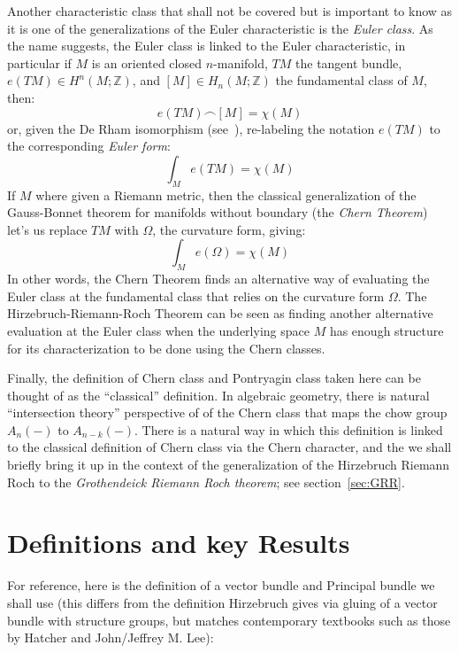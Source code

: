 \documentclass{ut-thesis}
\newcommand{\Z}{{\mathbb{Z}}}
\begin{document}
Another characteristic class that shall not be covered but is important to know as it is one of the
generalizations of the Euler characteristic is the \emph{Euler class}. As
the name suggests, the Euler class is linked to the Euler characteristic, in particular if $M$ is an oriented
closed $n$-manifold, $TM$ the tangent bundle, $e(TM) \in H^n(M; \Z)$, and $[M] \in H_n(M; \Z)$ the fundamental class of $M$, then:
\[
  e(TM) \frown [M] = \chi(M)
\]
or, given the De Rham isomorphism (see~\cite{NateDiffGeo}), re-labeling the notation $e(TM)$ to the corresponding \emph{Euler form}:
\[
  \int_M e(TM) = \chi(M)
\]
If $M$ where given a Riemann metric, then the classical generalization of the Gauss-Bonnet theorem for
manifolds without boundary (the \emph{Chern Theorem}) let's us replace $TM$ with $\Omega$, the curvature form,
giving:
\[
  \int_M e(\Omega) = \chi(M)
\]
In other words, the Chern Theorem finds an alternative way of evaluating the Euler class at the fundamental
class that relies on the curvature form $\Omega$. The Hirzebruch-Riemann-Roch Theorem can be seen as
finding another alternative evaluation at the Euler class when the underlying space $M$ has enough structure for
its characterization to be done using the Chern classes.

Finally, the definition of Chern class and Pontryagin class taken here can be thought of as the ``classical''
definition. In algebraic geometry, there is natural ``intersection theory'' perspective of of the Chern class
that maps the chow group $A_n(-)$ to $A_{n-k}(-)$. There is a natural way in which this definition is linked
to the classical definition of Chern class via the Chern character, and the we shall briefly bring it up in the context of the generalization of the
Hirzebruch Riemann Roch to the \emph{Grothendeick Riemann Roch theorem}; see section~\ref{sec:GRR}.

\section{Definitions and key Results}

For reference, here is the definition of a vector bundle and Principal bundle we shall use (this differs from
the definition Hirzebruch gives via gluing of a vector bundle with structure groups, but matches contemporary
textbooks such as those by Hatcher and John/Jeffrey M. Lee):
\end{document}
